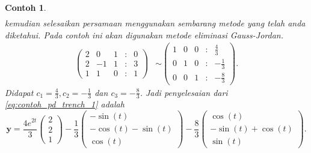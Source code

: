 \documentclass[a4paper]{article}
\theoremstyle{definisi}
\newtheorem{contoh}{Contoh}[section]
\numberwithin{equation}{section}
\begin{document}
\begin{contoh}
\begin{align*}
    \end{align*}
    kemudian selesaikan persamaan menggunakan sembarang metode yang telah anda diketahui. Pada contoh ini akan digunakan metode eliminasi Gauss-Jordan. 
    \begin{align*}
      \begin{pmatrix}
        2 & 0 & 1 &:& 0\\
        2 & -1 & 1 &:& 3\\
        1 & 1 & 0 &:& 1
      \end{pmatrix}
      &\sim \begin{pmatrix}
        1 & 0 & 0 &:& \frac{4}{3}\\
        0 & 1 & 0 &:& -\frac{1}{3}\\
        0 & 0 & 1 &:& -\frac{8}{3}
      \end{pmatrix}.
    \end{align*}
    Didapat $c_1 = \frac{4}{3}, c_2 = -\frac{1}{3}$ dan $c_3 = -\frac{8}{3}$. Jadi penyelesaian dari \eqref{eq:contoh_pd_trench_1} adalah
    \[\mathbf{y} = \frac{4e^{2t}}{3}\begin{pmatrix}2\\2\\1\end{pmatrix} - \frac{1}{3}\begin{pmatrix}-\sin(t)\\-\cos(t)-\sin(t)\\\cos(t)\end{pmatrix} - \frac{8}{3}\begin{pmatrix}\cos(t)\\-\sin(t)+\cos(t)\\\sin(t)\end{pmatrix}.\]
  \end{contoh}
\end{document}
